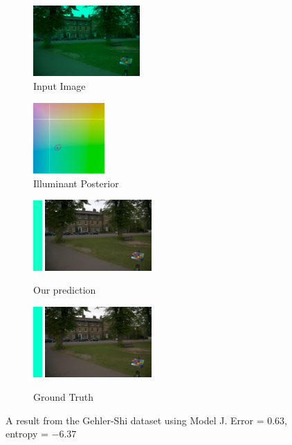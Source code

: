 \documentclass[10pt,twocolumn,letterpaper]{article}
\begin{document}
\begin{figure}[!]
\centering
  \begin{subfigure}[!]{1.7in}
    \includegraphics[width=1.6in]{figures/results/gehlershi/00000503_input.jpg}
    \caption{\footnotesize Input Image}
  \end{subfigure}
  \begin{subfigure}[!]{1.17in}
    \includegraphics[width=1.07in]{figures/results/gehlershi/00000503_chroma.png}
    \caption{\footnotesize Illuminant Posterior}
  \end{subfigure}
\begin{subfigure}[!]{1.9in}
    \includegraphics[width=0.133in]{figures/results/gehlershi/00000503_illum.png}\!
    \includegraphics[width=1.6in]{figures/results/gehlershi/00000503_prediction.jpg}
    \caption{\footnotesize Our prediction}
  \end{subfigure}
  \begin{subfigure}[!]{1.9in}
    \includegraphics[width=0.133in]{figures/results/gehlershi/00000503_illum_true.png}\!
    \includegraphics[width=1.6in]{figures/results/gehlershi/00000503_true.jpg}
    \caption{\footnotesize Ground Truth}
  \end{subfigure}
  \caption{
    A result from the Gehler-Shi dataset using Model J. Error = $0.63$\textdegree, entropy = $-6.37$
    \label{fig:results4}
  }
\end{figure}
\end{document}
